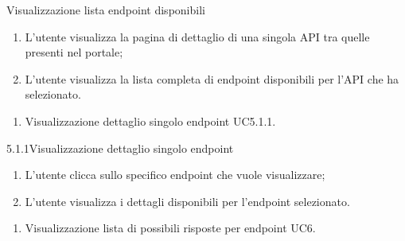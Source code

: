 \begin{usecase}{5.1}{Visualizzazione lista endpoint disponibili}\label{uc:visualizzazione-lista-endpoint-disponibili}

    \usecasemain{}
        \begin{enumerate}
            \item L'utente visualizza la pagina di dettaglio di una singola API tra quelle presenti nel portale;
            \item L'utente visualizza la lista completa di endpoint disponibili per l'API che ha selezionato.
        \end{enumerate}

    \usecasegen{}
        \begin{enumerate}
            \item Visualizzazione dettaglio singolo endpoint UC5.1.1.
        \end{enumerate}

\end{usecase}


\begin{usecase}{5.1.1}{Visualizzazione dettaglio singolo endpoint}\label{uc:visualizzazione-dettaglio-singolo-endpoint}

    \usecasemain{}
        \begin{enumerate}
            \item L'utente clicca sullo specifico endpoint che vuole visualizzare;
            \item L'utente visualizza i dettagli disponibili per l'endpoint selezionato.
        \end{enumerate}

    \usecaseext{}
        \begin{enumerate}
            \item Visualizzazione lista di possibili risposte per endpoint UC6.
        \end{enumerate}

\end{usecase}


